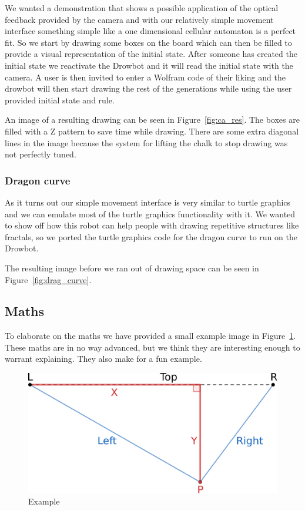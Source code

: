 \documentclass[12pt]{article}
\begin{document}
We wanted a demonstration that shows a possible application of the
optical feedback provided by the camera and with our relatively
simple movement interface something simple like a one dimensional
cellular automaton is a perfect fit.
So we start by drawing some boxes on the board which can then be
filled to provide a visual representation of the initial state.
After someone has created the initial state we reactivate the
Drowbot and it will read the initial state with the camera.
A user is then invited to enter a Wolfram code of their liking
and the drowbot will then start drawing the rest of the generations
while using the user provided initial state and rule.

An image of a resulting drawing can be seen in Figure~\ref{fig:ca_res}.
The boxes are filled with a Z pattern to save time while drawing.
There are some extra diagonal lines in the image because the system
for lifting the chalk to stop drawing was not perfectly tuned.

\subsubsection*{Dragon curve}

As it turns out our simple movement interface is very similar to
turtle graphics and we can emulate most of the turtle graphics
functionality with it.
We wanted to show off how this robot can help people with drawing
repetitive structures like fractals, so we ported the turtle
graphics code for the dragon curve to run on the Drowbot.

The resulting image before we ran out of drawing space can be
seen in Figure~\ref{fig:drag_curve}.


\subsection{Maths}

To elaborate on the maths we have provided a small example image
in Figure~\ref{fig:maths}.
These maths are in no way advanced, but we think they are interesting
enough to warrant explaining.
They also make for a fun example.

\begin{figure}[t]
  \centering
  \includegraphics[width=.5\textwidth]{img/drowbot-maths.eps}
  \caption{Example}
  \label{fig:maths}
\end{figure}
\end{document}
